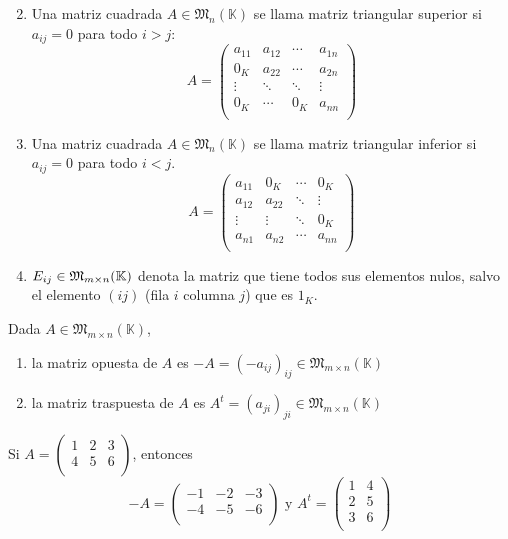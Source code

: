 \begin{definition}
\begin{enumerate}
\[		      \]
		\item Una matriz cuadrada \(A \in \mathfrak{M}_{n}(\mathbb{K}) \) se llama matriz triangular superior si \(a_{ij} = 0 \) para todo \(i>j \):
		      \[
			      A = \begin{pmatrix}
				      a_{11 } & a_{12 } & \cdots & a_{1n } \\
				      0_K     & a_{22 } & \cdots & a_{2n } \\
				      \vdots  & \ddots  & \ddots & \vdots  \\
				      0_K     & \cdots  & 0_K    & a_{nn}  \\
			      \end{pmatrix}
		      \]
		\item Una matriz cuadrada \(A \in \mathfrak{M}_{n}(\mathbb{K}) \) se llama matriz triangular inferior si \(a_{ij} = 0 \) para todo \(i<j \).
		      \[
			      A = \begin{pmatrix}
				      a_{11 } & 0_K     & \cdots & 0_K    \\
				      a_{12 } & a_{22 } & \ddots & \vdots \\
				      \vdots  & \vdots  & \ddots & 0_K    \\
				      a_{n1 } & a_{n2 } & \cdots & a_{nn} \\
			      \end{pmatrix}
		      \]
		\item \(E_{ij } \in \mathfrak{\MakeUppercase{m}}_{m\times n}(\mathbb{K })\) denota la matriz que tiene todos sus elementos nulos, salvo el elemento \((ij )\) (fila \(i \) columna \(j \)) que es \(1_K \).
	\end{enumerate}
\end{definition}

\begin{definition}
	Dada \(A \in \mathfrak{M}_{m \times n}(\mathbb{K}) \),
	\begin{enumerate}
		\item la matriz opuesta de \(A \) es \(-A = (-a_{ij})_{ij} \in \mathfrak{M}_{m \times n}(\mathbb{K}) \)
		\item la matriz traspuesta de \(A \) es \(A^{t} = (a_{ji})_{ji} \in \mathfrak{M}_{m \times n}(\mathbb{K}) \)
	\end{enumerate}
\end{definition}
\begin{example}
	Si \(A = \begin{pmatrix}
		1 & 2 & 3 \\
		4 & 5 & 6 \\
	\end{pmatrix}\), entonces
	\[
		-A = \begin{pmatrix}
			-1 & -2 & -3 \\
			-4 & -5 & -6 \\
		\end{pmatrix} \text{ y } A^{t} = \begin{pmatrix}
			1 & 4 \\
			2 & 5 \\
			3 & 6 \\
		\end{pmatrix}
	\]
\end{example}


